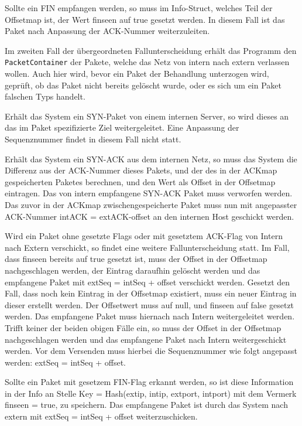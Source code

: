 \documentclass[../review_2.tex]{subfiles}
\begin{document}
Sollte ein FIN empfangen werden, so muss im Info-Struct, welches Teil der Offsetmap ist, der Wert finseen auf true gesetzt werden. In diesem Fall ist das Paket nach Anpassung der ACK-Nummer weiterzuleiten.



Im zweiten Fall der übergeordneten Fallunterscheidung erhält das Programm den \texttt{PacketContainer} der Pakete, welche das Netz von intern nach extern verlassen wollen. Auch hier wird, bevor ein Paket der Behandlung unterzogen wird, geprüft, ob das Paket nicht bereits gelöscht wurde, oder es sich um ein Paket falschen Typs handelt.

Erhält das System ein SYN-Paket von einem internen Server, so wird dieses an das im Paket spezifizierte Ziel weitergeleitet. Eine Anpassung der Sequenznummer findet in diesem Fall nicht statt.

Erhält das System ein SYN-ACK aus dem internen Netz, so muss das System die Differenz aus der ACK-Nummer dieses Pakets, und der des in der ACKmap gespeicherten Paketes berechnen, und den Wert als Offset in der Offsetmap eintragen. Das von intern empfangene SYN-ACK Paket muss verworfen werden.
Das zuvor in der ACKmap zwischengespeicherte Paket muss nun mit angepasster ACK-Nummer intACK = extACK-offset an den internen Host geschickt werden.

Wird ein Paket ohne gesetzte Flags oder mit gesetztem ACK-Flag von Intern nach Extern verschickt, so findet eine weitere Fallunterscheidung statt.
Im Fall, dass finseen bereits auf true gesetzt ist, muss der Offset in der Offsetmap nachgeschlagen werden, der Eintrag daraufhin gelöscht werden und das empfangene Paket mit extSeq = intSeq + offset verschickt werden.
Gesetzt den Fall, dass noch kein Eintrag in der Offsetmap existiert, muss ein neuer Eintrag in dieser erstellt werden. Der Offsetwert muss auf null, und finseen auf false gesetzt werden. Das empfangene Paket muss hiernach nach Intern weitergeleitet werden.
Trifft keiner der beiden obigen Fälle ein, so muss der Offset in der Offsetmap nachgeschlagen werden und das empfangene Paket nach Intern weitergeschickt werden. Vor dem Versenden muss hierbei die Sequenznummer wie folgt angepasst werden: extSeq = intSeq + offset.

Sollte ein Paket mit gesetzem FIN-Flag erkannt werden, so ist diese Information in der Info an Stelle Key = Hash(extip, intip, extport, intport) mit dem Vermerk finseen = true, zu speichern. Das empfangene Paket ist durch das System nach extern mit extSeq = intSeq + offset weiterzuschicken.
\end{document}
